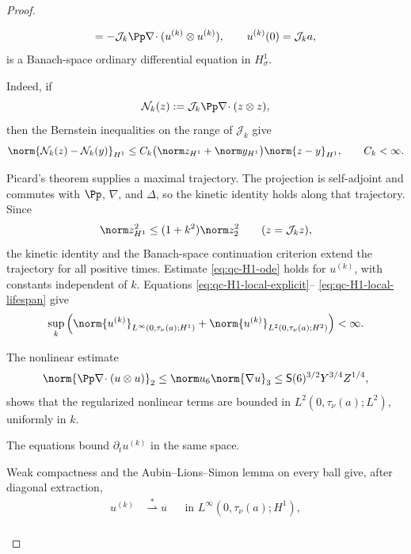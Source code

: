 \begin{proof}
\begin{samepage}
\begin{equation}
 =-\mathcal J_k\Pp\nabla\!\cdot
   (u^{(k)}\otimes u^{(k)}),
 \qquad u^{(k)}(0)=\mathcal J_ka,
 \label{eq:qc-H1-Friedrichs-system}
\end{equation}
is a Banach-space ordinary differential equation in \(H^1_\sigma\).
\end{samepage}
\begin{samepage}
Indeed, if
\[
 \mathcal N_k(z):=\mathcal J_k\Pp\nabla\!\cdot(z\otimes z),
\]
then the Bernstein inequalities on the range of \(\mathcal J_k\) give
\begin{equation}
 \norm{\mathcal N_k(z)-\mathcal N_k(y)}_{H^1}
 \le C_k\bigl(\norm z_{H^1}+\norm y_{H^1}\bigr)
       \norm{z-y}_{H^1},
 \qquad C_k<\infty.
 \label{eq:qc-H1-Friedrichs-Lipschitz}
\end{equation}
\end{samepage}
Picard's theorem supplies a maximal trajectory.  The projection is
self-adjoint and commutes with \(\Pp\), \(\nabla\), and \(\Delta\), so the
kinetic identity holds along that trajectory.  Since
\begin{equation}
 \norm z_{H^1}^2\le(1+k^2)\norm z_2^2
 \qquad(z=\mathcal J_kz),
 \label{eq:qc-H1-Friedrichs-band-control}
\end{equation}
the kinetic identity and the Banach-space continuation criterion extend the
trajectory for all positive times.  Estimate
\eqref{eq:qc-H1-ode} holds for \(u^{(k)}\), with constants independent of
\(k\).  Equations \eqref{eq:qc-H1-local-explicit}--
\eqref{eq:qc-H1-local-lifespan} give
\begin{equation}
 \sup_k\left(
 \norm{u^{(k)}}_{L^\infty(0,\tau_\nu(a);H^1)}
 +\norm{u^{(k)}}_{L^2(0,\tau_\nu(a);H^2)}
 \right)<\infty.
 \label{eq:qc-H1-Friedrichs-uniform}
\end{equation}
\begin{samepage}
The nonlinear estimate
\[
 \norm{\Pp\nabla\!\cdot(u\otimes u)}_2
 \le \norm u_6\norm{\nabla u}_3
 \le \mathsf S(6)^{3/2}Y^{3/4}Z^{1/4},
\]
shows that the regularized nonlinear terms are bounded in
\(L^2(0,\tau_\nu(a);L^2)\), uniformly in \(k\).
\par
\end{samepage}
The equations bound
\(\partial_tu^{(k)}\) in the same space.
\begin{samepage}
Weak compactness and the
Aubin--Lions--Simon lemma \cite{Aubin1963,Simon1987} on every ball give, after diagonal
extraction,
\begin{align*}
 u^{(k)}&\stackrel{*}{\rightharpoonup} u
 &&\text{in }L^\infty(0,\tau_\nu(a);H^1),\\

\end{align*}
\end{samepage}
\end{proof}

